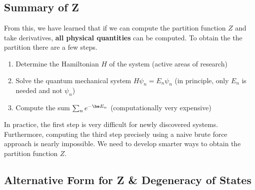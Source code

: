 \documentclass{article}
\begin{document}
\subsection{Summary of Z}
From this, we have learned that if we can compute the partition function $Z$ and take derivatives, \textbf{all physical quantities} can be computed. To obtain the the partition there are a few steps.
\begin{enumerate}
    \item Determine the Hamiltonian $H$ of the system (active areas of research)
    \item Solve the quantum mechanical system $H \psi_n = E_n \psi_n$ (in principle, only $E_n$ is needed and not $\psi_n$)
    \item Compute the sum $\sum_n e^{-\be E_n}$ (computationally very expensive)
\end{enumerate}
In practice, the first step is very difficult for newly discovered systems. Furthermore, computing the third step precisely using a naive brute force approach is nearly impossible. We need to develop smarter ways to obtain the partition function $Z$.

\subsection{Alternative Form for Z \& Degeneracy of States}
\end{document}

